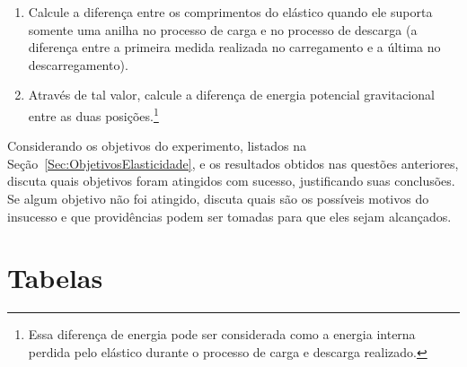\begin{question}[type={exam}]{3}
\begin{enumerate}[label=\roman*.]
\item Calcule a diferença entre os comprimentos do elástico quando ele suporta somente uma anilha no processo de carga e no processo de descarga (a diferença entre a primeira medida realizada no carregamento e a última no descarregamento).
\item Através de tal valor, calcule a diferença de energia potencial gravitacional entre as duas posições.\footnote{Essa diferença de energia pode ser considerada como a energia interna perdida pelo elástico durante o processo de carga e descarga realizado.}
\end{enumerate}
\end{question}

\begin{question}[type={exam}]{2}
Considerando os objetivos do experimento, listados na Seção~\ref{Sec:ObjetivosElasticidade}, e os resultados obtidos nas questões anteriores, discuta quais objetivos foram atingidos com sucesso, justificando suas conclusões. Se algum objetivo não foi atingido, discuta quais são os possíveis motivos do insucesso e que providências podem ser tomadas para que eles sejam alcançados.
\end{question}
\vfill

\pagebreak
\section{Tabelas}

